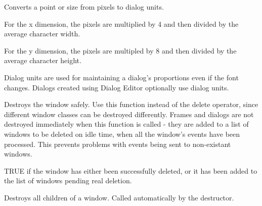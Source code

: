 
Converts a point or size from pixels to dialog units.

For the x dimension, the pixels are multiplied by 4 and then divided by the average
character width.

For the y dimension, the pixels are multipled by 8 and then divided by the average
character height.


Dialog units are used for maintaining a dialog's proportions even if the font changes.
Dialogs created using Dialog Editor optionally use dialog units.





\label{wxwindowdestroy}


Destroys the window safely. Use this function instead of the delete operator, since
different window classes can be destroyed differently. Frames and dialogs
are not destroyed immediately when this function is called - they are added
to a list of windows to be deleted on idle time, when all the window's events
have been processed. This prevents problems with events being sent to non-existant
windows.


TRUE if the window has either been successfully deleted, or it has been added
to the list of windows pending real deletion.



Destroys all children of a window.  Called automatically by the destructor.

\label{wxwindowdragacceptfiles}

